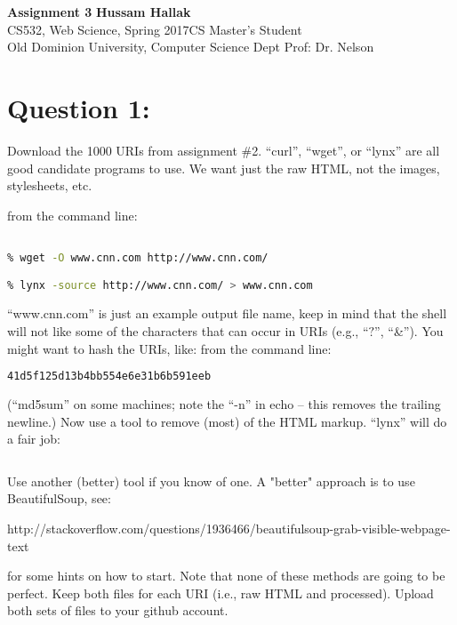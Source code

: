 \documentclass[a4paper, 11pt]{article}
\begin{document}
\noindent
\large\textbf{Assignment 3} \hfill \textbf{Hussam Hallak} \\
\normalsize CS532, Web Science, Spring 2017\hfill CS Master's Student \\
Old Dominion University, Computer Science Dept \hfill Prof: Dr. Nelson 

\section*{Question 1:}
Download the 1000 URIs from assignment \#2.  ``curl'', ``wget'', or
``lynx'' are all good candidate programs to use.  We want just the
raw HTML, not the images, stylesheets, etc.

from the command line:
\begin{lstlisting}[language=bash,label=Command:, breakatwhitespace=〈false), caption=Command:]
% curl http://www.cnn.com/ > www.cnn.com

% wget -O www.cnn.com http://www.cnn.com/

% lynx -source http://www.cnn.com/ > www.cnn.com
\end{lstlisting}

``www.cnn.com'' is just an example output file name, keep in mind
that the shell will not like some of the characters that can occur
in URIs (e.g., ``$?$'', ``\&'').  You might want to hash the URIs, like:
from the command line:
\begin{lstlisting}[language=bash,label=Command:, breakatwhitespace=〈false), caption=Command:]
% echo -n "http://www.cs.odu.edu/show_features.shtml?72" | md5
41d5f125d13b4bb554e6e31b6b591eeb
\end{lstlisting}
(``md5sum'' on some machines; note the ``-n'' in echo -- this removes
the trailing newline.) 
\linebreak
\linebreak
\noindent
Now use a tool to remove (most) of the HTML markup.  ``lynx'' will
do a fair job:
\begin{lstlisting}[language=bash,label=Command:, breakatwhitespace=〈false), caption=Command:]
% lynx -dump -force_html www.cnn.com > www.cnn.com.processed
\end{lstlisting}
Use another (better) tool if you know of one.  
\noindent
A "better" approach is to use BeautifulSoup, see:

http://stackoverflow.com/questions/1936466/beautifulsoup-grab-visible-webpage-text

\noindent
for some hints on how to start.  Note that none of these methods 
are going to be perfect.
\linebreak
\linebreak
\noindent
Keep both files for each URI (i.e., raw HTML and processed). 
Upload both sets of files to your github account.
\end{document}
